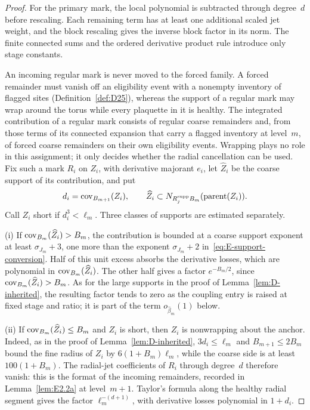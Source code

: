 \begin{proof}
For the primary mark, the local polynomial is subtracted through degree~$d$ before rescaling. Each remaining term has at least one additional scaled jet weight, and the block rescaling gives the inverse block factor in its norm. The finite connected sums and the ordered derivative product rule introduce only stage constants.

An incoming regular mark is never moved to the forced family. A forced remainder must vanish off an eligibility event with a nonempty inventory of flagged sites (Definition~\ref{def:D25}), whereas the support of a regular mark may wrap around the torus while every plaquette in it is healthy. The integrated contribution of a regular mark consists of regular coarse remainders and, from those terms of its connected expansion that carry a flagged inventory at level~$m$, of forced coarse remainders on their own eligibility events. Wrapping plays no role in this assignment; it only decides whether the radial cancellation can be used. Fix such a mark $R_i$ on $Z_i$, with derivative majorant $e_i$, let $\widehat Z_i$ be the coarse support of its contribution, and put
\begin{equation*}
 d_i=\operatorname{cov}_{B_{m+1}}(Z_i),\qquad
 \widehat Z_i\subset N_{R_j^{\rm supp}B_m}(\operatorname{parent}(Z_i)).
\end{equation*}
Call $Z_i$ short if $d_i^3<\ell_m$. Three classes of supports are estimated separately.

(i) If $\operatorname{cov}_{B_m}(\widehat Z_i)>B_m$, the contribution is bounded at a coarse support exponent at least $\sigma_{J_m}+3$, one more than the exponent $\sigma_{J_m}+2$ in~\eqref{eq:E-support-conversion}. Half of this unit excess absorbs the derivative losses, which are polynomial in $\operatorname{cov}_{B_m}(\widehat Z_i)$. The other half gives a factor $e^{-B_m/2}$, since $\operatorname{cov}_{B_m}(\widehat Z_i)>B_m$. As for the large supports in the proof of Lemma~\ref{lem:D-inherited}, the resulting factor tends to zero as the coupling entry is raised at fixed stage and ratio; it is part of the term $o_{\widehat\beta_m}(1)$ below.

(ii) If $\operatorname{cov}_{B_m}(\widehat Z_i)\le B_m$ and $Z_i$ is short, then $Z_i$ is nonwrapping about the anchor. Indeed, as in the proof of Lemma~\ref{lem:D-inherited}, $3d_i\le\ell_m$ and $B_{m+1}\le2B_m$ bound the fine radius of $Z_i$ by $6(1+B_m)\ell_m$, while the coarse side is at least $100(1+B_m)$. The radial-jet coefficients of $R_i$ through degree~$d$ therefore vanish: this is the format of the incoming remainders, recorded in Lemma~\ref{lem:E2.2a} at level~$m+1$. Taylor's formula along the healthy radial segment gives the factor $\ell_m^{-(d+1)}$, with derivative losses polynomial in $1+d_i$.


\end{proof}
